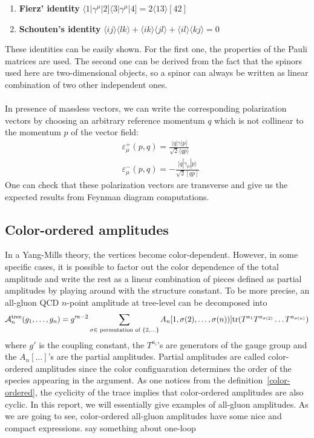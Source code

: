 \begin{enumerate}
\item \textbf{Fierz' identity} $\langle 1 |\gamma^\mu |2]\langle 3 |\gamma^\mu|4] = 2\langle 13 \rangle [42]$
\item \textbf{Schouten's identity} $\langle ij \rangle \langle lk \rangle + \langle ik\rangle \langle jl\rangle + \langle il \rangle \langle kj \rangle = 0$
\end{enumerate}
These identities can be easily shown.
For the first one, the properties of the Pauli matrices are used.
The second one can be derived from the fact that the spinors used here are two-dimensional objects, so a spinor can always be written as linear combination of two other independent ones.
%
\\\\
In presence of massless vectors, we can write the corresponding polarization vectors by choosing an arbitrary reference momentum $q$ which is not collinear to the momentum $p$ of the vector field:
\begin{equation*}
\begin{split}
& \varepsilon^+_\mu (p, q) = \frac{\langle q | \gamma |p]}{\sqrt{2}\langle qp \rangle}
\\
& \varepsilon^-_\mu (p, q) = -\frac{[q|\gamma_\mu | p\rangle}{\sqrt{2}[qp]}
\end{split}
\end{equation*}
One can check that these polarization vectors are transverse and give us the expected results from Feynman diagram computations. 
%
%
\subsection*{Color-ordered amplitudes}
In a Yang-Mills theory, the vertices become color-dependent. 
However, in some specific cases, it is possible to factor out the color dependence of the total amplitude and write the rest as a linear combination of pieces defined as partial amplitudes by playing around with the structure constant.
To be more precise, an all-gluon QCD $n$-point amplitude at tree-level can be decomposed into~\cite{MANGANO1988461}
\begin{equation}\label{color-ordered}
\mathcal{A}_n^{\mathrm{tree}}(g_1, \ldots, g_n) = g'^{n-2}\sum_{\sigma\in\textrm{ permutation of }\{2,\ldots\}} A_n[1,\sigma(2),\ldots,\sigma(n))]\mathrm{tr}(T^{a_1} T^{a_{\sigma(2)}}\ldots T^{a_{\sigma(n)}})
\end{equation}
where $g'$ is the coupling constant, the $T^{a_i}$'s are generators of the gauge group and the $A_n[\ldots]$'s are the partial amplitudes.
Partial amplitudes are called color-ordered amplitudes since the color configuaration determines the order of the species appearing in the argument.
As one notices from the definition~\cref{color-ordered}, the cyclicity of the trace implies that color-ordered amplitudes are also cyclic. 
In this report, we will essentially give examples of all-gluon amplitudes.
As we are going to see, color-ordered all-gluon amplitudes have some nice and compact expressions.
\color{red} say something about one-loop\color{black}
%
%
